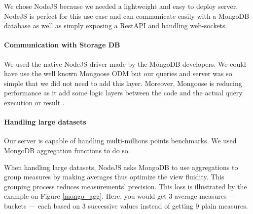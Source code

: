 \documentclass[a4paper,11pt]{report}
\begin{document}
We chose NodeJS because we needed a lightweight and easy to deploy server. NodeJS is perfect for this use case and can communicate easily with a MongoDB database as well as simply exposing a RestAPI and handling web-sockets.

\paragraph{Communication with Storage DB}\label{server:mongo}

We used the native NodeJS driver made by the MongoDB developers. We could have use the well known Mongoose ODM but our queries and server was so simple that we did not need to add this layer. Moreover, Mongoose is reducing performance as it add some logic layers between the code and the actual query execution or result \cite{mongo}.

\paragraph{Handling large datasets}\label{server:handling_large_dataset}

Our server is capable of handling multi-millions points benchmarks. We used MongoDB aggregation functions to do so.

When handling large datasets, NodeJS asks MongoDB to use aggregations to group measures by making averages thus optimize the view fluidity. This grouping process reduces measurements' precision. This loss is illustrated by the example on Figure \ref{mongo_agg}. Here, you would get 3 average measures --- buckets --- each based on 3 successive values instead of getting 9 plain measures.
\end{document}
